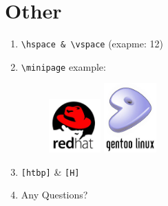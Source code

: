 \documentclass[aspectratio=43]{beamer}
\begin{document}
\section{Other}
\begin{frame}[fragile]
\begin{enumerate}
\item \verb!\hspace & \vspace! (exapme: 1\hspace{1cm}2)
\item \verb!\minipage! example:
\begin{figure}
\begin{minipage}[b]{0.3\linewidth}
\centering
\includegraphics[width=2cm]{pictures/redhat.jpg}
\end{minipage}
\begin{minipage}[b]{0.3\linewidth}
\centering
\includegraphics[width=2cm]{pictures/gentoo.jpg}
\end{minipage}
\end{figure}
\item \verb![htbp]! \& \verb![H]!
\item Any Questions?
\end{enumerate}
\end{frame}
\end{document}
